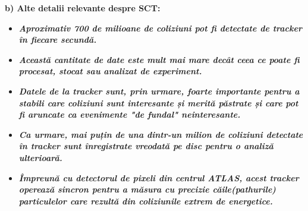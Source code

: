 \documentclass{beamer}
\begin{document}
\begin{frame}{\textbf{b) Alte detalii relevante despre SCT:}}
\small

\begin{itemize}

     \small
    \item[\ding{39}]{\makebox[0.5cm]{} \textit{\textbf{Aproximativ 700 de milioane de coliziuni pot fi detectate de tracker în fiecare secundă.}}}

    \item[\ding{39}]{\makebox[0.5cm]{} \textit{\textbf{Această cantitate de date este mult mai mare decât ceea ce poate fi procesat, stocat sau analizat de experiment.}}}
  
    \item[\ding{39}]{\makebox[0.5cm]{} \textit{\textbf{Datele de la tracker sunt, prin urmare, foarte importante pentru a stabili care coliziuni sunt interesante și merită păstrate și care pot fi aruncate ca evenimente "de fundal" neinteresante.}}}
  
    \item[\ding{39}]{\makebox[0.5cm]{} \textit{\textbf{Ca urmare, mai puțin de una dintr-un milion de coliziuni detectate în tracker sunt înregistrate vreodată pe disc pentru o analiză ulterioară.}}}

    \item[\ding{39}]{\makebox[0.5cm]{} \textit{\textbf{Împreună cu detectorul de pixeli din centrul ATLAS, acest tracker operează sincron pentru a măsura cu precizie căile(pathurile) particulelor care rezultă din coliziunile extrem de energetice.}}}
    
\end{itemize}

\end{frame}



\end{document}
